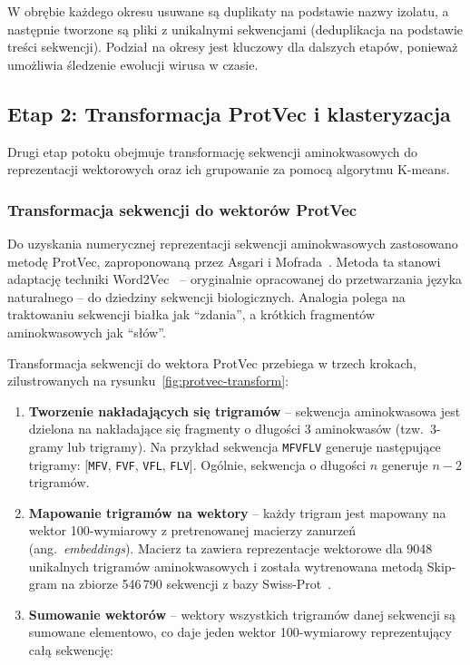 W obrębie każdego okresu usuwane są duplikaty na podstawie nazwy izolatu, a następnie tworzone są pliki z unikalnymi sekwencjami (deduplikacja na podstawie treści sekwencji). Podział na okresy jest kluczowy dla dalszych etapów, ponieważ umożliwia śledzenie ewolucji wirusa w czasie.

\subsection{Etap 2: Transformacja ProtVec i klasteryzacja}
\label{subsec:klasteryzacja}

Drugi etap potoku obejmuje transformację sekwencji aminokwasowych do reprezentacji wektorowych oraz ich grupowanie za pomocą algorytmu K-means.

\subsubsection{Transformacja sekwencji do wektorów ProtVec}
\label{subsubsec:protvec}

Do uzyskania numerycznej reprezentacji sekwencji aminokwasowych zastosowano metodę ProtVec, zaproponowaną przez Asgari i Mofrada~\cite{asgari2015protvec}. Metoda ta stanowi adaptację techniki Word2Vec~\cite{mikolov2013word2vec} -- oryginalnie opracowanej do przetwarzania języka naturalnego -- do dziedziny sekwencji biologicznych. Analogia polega na traktowaniu sekwencji białka jak ``zdania'', a krótkich fragmentów aminokwasowych jak ``słów''.

Transformacja sekwencji do wektora ProtVec przebiega w trzech krokach, zilustrowanych na rysunku~\ref{fig:protvec-transform}:

\begin{enumerate}
    \item \textbf{Tworzenie nakładających się trigramów} -- sekwencja aminokwasowa jest dzielona na nakładające się fragmenty o długości 3 aminokwasów (tzw.~3-gramy lub trigramy). Na przykład sekwencja \texttt{MFVFLV} generuje następujące trigramy: [\texttt{MFV}, \texttt{FVF}, \texttt{VFL}, \texttt{FLV}]. Ogólnie, sekwencja o długości $n$ generuje $n - 2$ trigramów.

    \item \textbf{Mapowanie trigramów na wektory} -- każdy trigram jest mapowany na wektor 100-wymiarowy z pretrenowanej macierzy zanurzeń (ang.~\emph{embeddings}). Macierz ta zawiera reprezentacje wektorowe dla 9048 unikalnych trigramów aminokwasowych i została wytrenowana metodą Skip-gram na zbiorze 546\,790 sekwencji z bazy Swiss-Prot~\cite{asgari2015protvec}.

    \item \textbf{Sumowanie wektorów} -- wektory wszystkich trigramów danej sekwencji są sumowane elementowo, co daje jeden wektor 100-wymiarowy reprezentujący całą sekwencję:
\end{enumerate}

